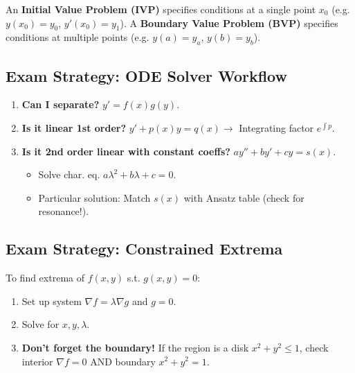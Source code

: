 \begin{definition}
    An \textbf{Initial Value Problem (IVP)} specifies conditions at a single point $x_0$ (e.g. $y(x_0) = y_0$, $y'(x_0) = y_1$).
    A \textbf{Boundary Value Problem (BVP)} specifies conditions at multiple points (e.g. $y(a) = y_a$, $y(b) = y_b$).
\end{definition}
\subsection{Exam Strategy: ODE Solver Workflow}
\begin{enumerate}
    \item \textbf{Can I separate?} $y' = f(x)g(y)$.
    \item \textbf{Is it linear 1st order?} $y' + p(x)y = q(x) \to$ Integrating factor $e^{\int p}$.
    \item \textbf{Is it 2nd order linear with constant coeffs?} $ay'' + by' + cy = s(x)$.
        \begin{itemize}
            \item Solve char. eq. $a\lambda^2 + b\lambda + c = 0$.
            \item Particular solution: Match $s(x)$ with Ansatz table (check for resonance!).
        \end{itemize}
\end{enumerate}

\subsection{Exam Strategy: Constrained Extrema}
To find extrema of $f(x,y)$ s.t. $g(x,y)=0$:
\begin{enumerate}
    \item Set up system $\nabla f = \lambda \nabla g$ and $g = 0$.
    \item Solve for $x, y, \lambda$.
    \item \textbf{Don't forget the boundary!} If the region is a disk $x^2+y^2 \le 1$, check interior $\nabla f = 0$ AND boundary $x^2+y^2=1$.
\end{enumerate}

